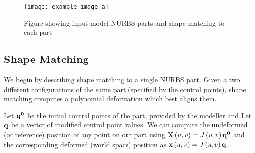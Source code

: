 


\begin{figure}
    \texttt{[image: example-image-a]}
    \caption{Figure showing input model NURBS parts and shape matching to each part}
    \label{fig:shapematching}
\end{figure}

\subsection{Shape Matching}

We begin by describing shape matching to a single NURBS part. 
Given a two different configurations of the same part (specified by the control points), shape matching computes a polynomial deformation which best aligns them.

Let $\mathbf{q^0}$ be the initial control points of the part, provided by the modeller and Let $\mathbf{q}$ be a vector of modified control point values.
We can compute the undeformed (or reference) position of any point on our part using $\mathbf{X}\left(u,v\right) = J\left(u,v\right)\mathbf{q^0}$ and the corresponding
deformed (world space) position as $\mathbf{x}\left(u,v\right) = J\left(u,v\right)\mathbf{q}$.

